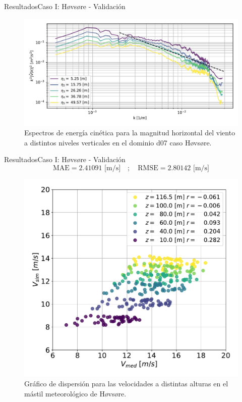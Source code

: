 \documentclass[mathserif,10pt]{beamer}
\begin{document}
\begin{frame}{Resultados}{Caso I: Høvsøre - Validación}
	\begin{figure}[H]
		\centering
		\hspace*{-5mm}\includegraphics[width=1.1\linewidth,page=1,trim={3mm 5mm -7mm 3mm},clip]{fig/06/hov/spectra}%
		\caption{Espectros de energía cinética para la magnitud horizontal del viento a distintos niveles verticales en el dominio d07 caso Høvsøre.}
		\label{fig:06_hov_spectrum}
	\end{figure}
\end{frame}

\begin{frame}{Resultados}{Caso I: Høvsøre - Validación}
	\[ \boxed{\text{MAE} = 2.41091 \text{ [m/s]} \quad;\quad \text{RMSE} = 2.80142 \text{ [m/s]}} \]
	\begin{figure}[H]
		\centering
		\vspace{-3mm}
		\includegraphics[width=0.6\linewidth,page=1,trim={0cm 5mm -1cm 0cm},clip]{fig/06/hov/corr}%
		\vspace{-3mm}
		\caption{Gráfico de dispersión para las velocidades a distintas alturas en el mástil meteorológico de Høvsøre.}
		\label{fig:06_corr_hov}
	\end{figure}
\end{frame}
\end{document}
